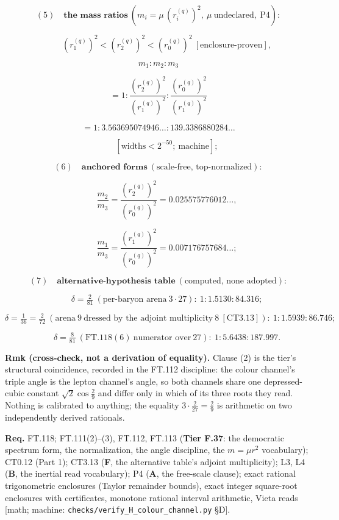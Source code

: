 \begin{theorem}[{\texorpdfstring{FT.119 — The triplet-attached mixing angle $\delta_q=2/27$ and its spectrum}{FT.119 - The triplet-attached mixing angle and its spectrum}}]
\[
(5)\quad\textbf{the mass ratios}\ (m_i=\mu\,(r^{(q)}_i)^2,\ \mu\ \text{undeclared},\ \mathrm{P4}):
\]

\[
\qquad (r^{(q)}_1)^2<(r^{(q)}_2)^2<(r^{(q)}_0)^2\ [\text{enclosure-proven}],
\]

\[
m_1:m_2:m_3
\]

\[
= 1:\frac{(r^{(q)}_2)^2}{(r^{(q)}_1)^2}:\frac{(r^{(q)}_0)^2}{(r^{(q)}_1)^2}
\]

\[
= 1:3.563695074946\ldots:139.3386880284\ldots
\]

\[
\qquad [\text{widths}<2^{-50};\ \text{machine}];
\]

\[
(6)\quad\textbf{anchored forms}\ (\text{scale-free, top-normalized}):
\]

\[
\qquad \frac{m_2}{m_3}=\frac{(r^{(q)}_2)^2}{(r^{(q)}_0)^2}=0.025575776012\ldots,
\]

\[
\qquad \frac{m_1}{m_3}=\frac{(r^{(q)}_1)^2}{(r^{(q)}_0)^2}=0.007176757684\ldots;
\]

\[
(7)\quad\textbf{alternative-hypothesis table}\ (\text{computed, none adopted}):
\]

\[
\qquad \delta=\tfrac2{81}\ (\text{per-baryon arena}\ 3\cdot27):\ 1:1.5130:84.316;
\]

\[
\delta=\tfrac1{36}=\tfrac2{72}\ (\text{arena}\ 9\ \text{dressed by the adjoint multiplicity}\ 8\ [\mathrm{CT3.13}]):\ 1:1.5939:86.746;
\]

\[
\qquad \delta=\tfrac8{81}\ (\mathrm{FT.118}(6)\ \text{numerator over}\ 27):\ 1:5.6438:187.997.
\]

\textbf{Rmk (cross-check, not a derivation of equality).} Clause (2) is the tier's structural coincidence, recorded in the FT.112 discipline: the colour channel's triple angle is the lepton channel's angle, so both channels share one depressed-cubic constant $\sqrt2\cos\tfrac29$ and differ only in which of its three roots they read. Nothing is calibrated to anything; the equality $3\cdot\tfrac2{27}=\tfrac29$ is arithmetic on two independently derived rationals.

\textbf{Req.} FT.118; FT.111(2)–(3), FT.112, FT.113 (\textbf{Tier F.37}: the democratic spectrum form, the normalization, the angle discipline, the $m=\mu r^2$ vocabulary); CT0.12 (Part 1); CT3.13 (\textbf{F}, the alternative table's adjoint multiplicity); L3, L4 (\textbf{B}, the inertial read vocabulary); P4 (\textbf{A}, the free-scale clause); exact rational trigonometric enclosures (Taylor remainder bounds), exact integer square-root enclosures with certificates, monotone rational interval arithmetic, Vieta reads [math; machine: \texttt{checks/\allowbreak{}verify\_\allowbreak{}H\_\allowbreak{}colour\_\allowbreak{}channel.py} §D].


\end{theorem}

